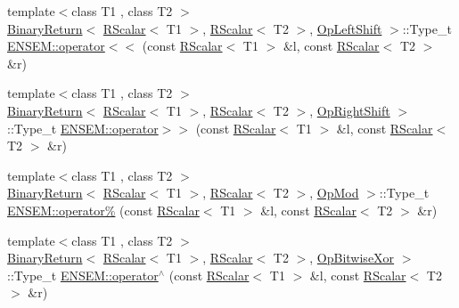 \begin{DoxyCompactItemize}
\item 
{\footnotesize template$<$class T1 , class T2 $>$ }\\\mbox{\hyperlink{structENSEM_1_1BinaryReturn}{Binary\+Return}}$<$ \mbox{\hyperlink{classENSEM_1_1RScalar}{R\+Scalar}}$<$ T1 $>$, \mbox{\hyperlink{classENSEM_1_1RScalar}{R\+Scalar}}$<$ T2 $>$, \mbox{\hyperlink{structENSEM_1_1OpLeftShift}{Op\+Left\+Shift}} $>$\+::Type\+\_\+t \mbox{\hyperlink{group__rscalar_ga6cce85d32b25e3574980320d6e6bd811}{E\+N\+S\+E\+M\+::operator$<$$<$}} (const \mbox{\hyperlink{classENSEM_1_1RScalar}{R\+Scalar}}$<$ T1 $>$ \&l, const \mbox{\hyperlink{classENSEM_1_1RScalar}{R\+Scalar}}$<$ T2 $>$ \&r)
\item 
{\footnotesize template$<$class T1 , class T2 $>$ }\\\mbox{\hyperlink{structENSEM_1_1BinaryReturn}{Binary\+Return}}$<$ \mbox{\hyperlink{classENSEM_1_1RScalar}{R\+Scalar}}$<$ T1 $>$, \mbox{\hyperlink{classENSEM_1_1RScalar}{R\+Scalar}}$<$ T2 $>$, \mbox{\hyperlink{structENSEM_1_1OpRightShift}{Op\+Right\+Shift}} $>$\+::Type\+\_\+t \mbox{\hyperlink{group__rscalar_ga2b0d653b11b094308672a6a37a90d2c3}{E\+N\+S\+E\+M\+::operator$>$$>$}} (const \mbox{\hyperlink{classENSEM_1_1RScalar}{R\+Scalar}}$<$ T1 $>$ \&l, const \mbox{\hyperlink{classENSEM_1_1RScalar}{R\+Scalar}}$<$ T2 $>$ \&r)
\item 
{\footnotesize template$<$class T1 , class T2 $>$ }\\\mbox{\hyperlink{structENSEM_1_1BinaryReturn}{Binary\+Return}}$<$ \mbox{\hyperlink{classENSEM_1_1RScalar}{R\+Scalar}}$<$ T1 $>$, \mbox{\hyperlink{classENSEM_1_1RScalar}{R\+Scalar}}$<$ T2 $>$, \mbox{\hyperlink{structENSEM_1_1OpMod}{Op\+Mod}} $>$\+::Type\+\_\+t \mbox{\hyperlink{group__rscalar_ga98c5cade5781b5cdc4cbb1bb1d52739c}{E\+N\+S\+E\+M\+::operator\%}} (const \mbox{\hyperlink{classENSEM_1_1RScalar}{R\+Scalar}}$<$ T1 $>$ \&l, const \mbox{\hyperlink{classENSEM_1_1RScalar}{R\+Scalar}}$<$ T2 $>$ \&r)
\item 
{\footnotesize template$<$class T1 , class T2 $>$ }\\\mbox{\hyperlink{structENSEM_1_1BinaryReturn}{Binary\+Return}}$<$ \mbox{\hyperlink{classENSEM_1_1RScalar}{R\+Scalar}}$<$ T1 $>$, \mbox{\hyperlink{classENSEM_1_1RScalar}{R\+Scalar}}$<$ T2 $>$, \mbox{\hyperlink{structENSEM_1_1OpBitwiseXor}{Op\+Bitwise\+Xor}} $>$\+::Type\+\_\+t \mbox{\hyperlink{group__rscalar_gaded7a3a7e06c5438511a12e861cbd165}{E\+N\+S\+E\+M\+::operator$^\wedge$}} (const \mbox{\hyperlink{classENSEM_1_1RScalar}{R\+Scalar}}$<$ T1 $>$ \&l, const \mbox{\hyperlink{classENSEM_1_1RScalar}{R\+Scalar}}$<$ T2 $>$ \&r)

\end{DoxyCompactItemize}
